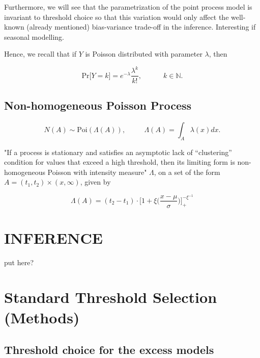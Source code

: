 \documentclass[11pt,a4paper,openany ]{book}
\begin{document}
Furthermore, we will see that the parametrization of the point process model is invariant to threshold choice %
so that this variation would only affect the well-known (already mentioned) bias-variance trade-off in the inference. Interesting if seasonal modelling.




Hence, we recall that if $Y$ is Poisson distributed with parameter $\lambda$, then 

\begin{equation}\label{poissdist}
\text{Pr}\big[Y=k\big]= e^{-\lambda}\frac{\lambda^k}{k!}, \qquad\quad k\in\mathbb{N.}
\end{equation}


\subsection{Non-homogeneous Poisson Process} 

\begin{equation}
N(A)\sim \text{Poi}(\Lambda(A)), \ \ \ \ \ \ \ \,\ \ \ \ \Lambda (A) = \int_A \lambda (x)dx.
\end{equation}


 "If a process is stationary and satisfies an asymptotic
lack of “clustering” condition for values that exceed a high threshold, then its limiting form is
non-homogeneous Poisson with intensity measure" $\Lambda$, on a set of the form $A = (t_1,t_2)\times (x,\infty)$, given by 

\begin{equation}
\Lambda(A) = (t_2-t_1)\cdot\bigg[1+\xi\bigg(\frac{x-\mu}{\sigma}\bigg)\bigg]^{-\xi^{-1}}_+
\end{equation}





\section{INFERENCE} put here?



\section{Standard Threshold Selection (Methods) }\label{stdthr}

\subsection{Threshold choice for the excess models}
\end{document}
